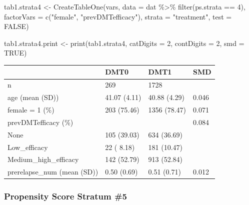\documentclass[
  letterpaper,
  DIV=11,
  numbers=noendperiod]{scrreprt}
\newenvironment{Shaded}{\begin{snugshade}}{\end{snugshade}}
\newcommand{\AttributeTok}[1]{\textcolor[rgb]{0.40,0.45,0.13}{#1}}
\newcommand{\ConstantTok}[1]{\textcolor[rgb]{0.56,0.35,0.01}{#1}}
\newcommand{\DecValTok}[1]{\textcolor[rgb]{0.68,0.00,0.00}{#1}}
\newcommand{\FunctionTok}[1]{\textcolor[rgb]{0.28,0.35,0.67}{#1}}
\newcommand{\NormalTok}[1]{\textcolor[rgb]{0.00,0.23,0.31}{#1}}
\newcommand{\OtherTok}[1]{\textcolor[rgb]{0.00,0.23,0.31}{#1}}
\newcommand{\SpecialCharTok}[1]{\textcolor[rgb]{0.37,0.37,0.37}{#1}}
\newcommand{\StringTok}[1]{\textcolor[rgb]{0.13,0.47,0.30}{#1}}
\begin{document}
\begin{Shaded}
\begin{Highlighting}[]
\NormalTok{tab1.strata4 }\OtherTok{\textless{}{-}} \FunctionTok{CreateTableOne}\NormalTok{(vars, }\AttributeTok{data =}\NormalTok{ dat }\SpecialCharTok{\%\textgreater{}\%} \FunctionTok{filter}\NormalTok{(ps.strata }\SpecialCharTok{==} \DecValTok{4}\NormalTok{), }
                               \AttributeTok{factorVars =} \FunctionTok{c}\NormalTok{(}\StringTok{"female"}\NormalTok{, }\StringTok{"prevDMTefficacy"}\NormalTok{), }
                               \AttributeTok{strata =} \StringTok{"treatment"}\NormalTok{, }\AttributeTok{test =} \ConstantTok{FALSE}\NormalTok{)}

\NormalTok{tab1.strata4.print }\OtherTok{\textless{}{-}} \FunctionTok{print}\NormalTok{(tab1.strata4, }\AttributeTok{catDigits =} \DecValTok{2}\NormalTok{, }\AttributeTok{contDigits =} \DecValTok{2}\NormalTok{, }
                            \AttributeTok{smd =} \ConstantTok{TRUE}\NormalTok{)}
\end{Highlighting}
\end{Shaded}

\begin{longtable}[]{@{}llll@{}}
\toprule\noalign{}
& DMT0 & DMT1 & SMD \\
\midrule\noalign{}
\endhead
\bottomrule\noalign{}
\endlastfoot
n & 269 & 1728 & \\
age (mean (SD)) & 41.07 (4.11) & 40.88 (4.29) & 0.046 \\
female = 1 (\%) & 203 (75.46) & 1356 (78.47) & 0.071 \\
prevDMTefficacy (\%) & & & 0.084 \\
None & 105 (39.03) & 634 (36.69) & \\
Low\_efficacy & 22 ( 8.18) & 181 (10.47) & \\
Medium\_high\_efficacy & 142 (52.79) & 913 (52.84) & \\
prerelapse\_num (mean (SD)) & 0.50 (0.69) & 0.51 (0.71) & 0.012 \\
\end{longtable}

\hypertarget{propensity-score-stratum-5}{%
\subsubsection{Propensity Score Stratum
\#5}\label{propensity-score-stratum-5}}
\end{document}
